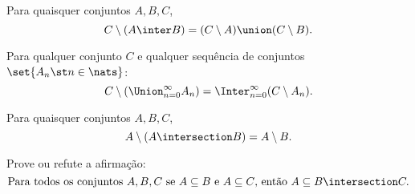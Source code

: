 \begin{exercise}
    Para quaisquer conjuntos $A,B,C$,
        $$
        C \setminus (A \inter B) = (C \setminus A) \union (C \setminus B).
        $$
\end{exercise}

\begin{exercise}
    Para qualquer conjunto $C$ e qualquer sequência de conjuntos $\set{A_n \st n \in \nats}$:
        $$
        C \setminus (\Union_{n = 0}^{\infty} A_n) = \Inter_{n = 0}^{\infty} (C \setminus A_n).
        $$
\end{exercise}

\begin{exercise}
    Para quaisquer conjuntos $A,B,C$,
    $$
        A \setminus (A \intersection B) = A \setminus B.
    $$
\end{exercise}

\begin{exercise}
    Prove ou refute a afirmação:
    $$
        \text {Para todos os conjuntos } A,B,C \text{ se } A \subseteq B \text{ e } A \subseteq C \text{, então }  A \subseteq B \intersection C.
    $$
\end{exercise}
